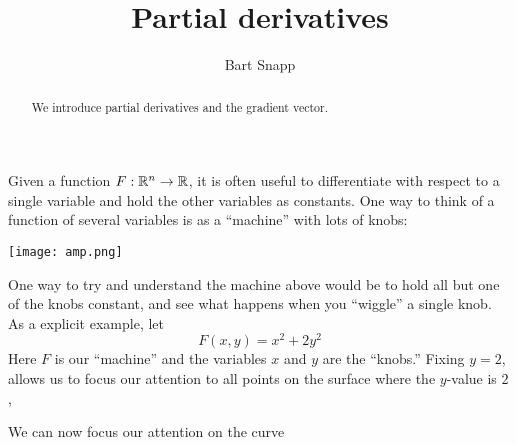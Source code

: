 \documentclass{ximera}
\author{Bart Snapp}
\title[Dig-In:]{Partial derivatives}
\begin{document}
\begin{abstract}
  We introduce partial derivatives and the gradient vector.
\end{abstract}
\maketitle

Given a function $F:\mathbb R^n \to \mathbb R$, it is often useful to differentiate
with respect to a single variable and hold the other variables as
constants. One way to think of a function of several variables is as a
``machine'' with lots of knobs:
\begin{image}
  \texttt{[image: amp.png]}
\end{image}
One way to try and understand the machine above would be to hold all
but one of the knobs constant, and see what happens when you
``wiggle'' a single knob.  As a explicit example, let
\[
F(x,y) = x^2+2y^2
\]
Here $F$ is our ``machine'' and the variables $x$ and $y$ are the ``knobs.''
Fixing $y=2$, allows us to focus our attention to all points on the
surface where the $y$-value is $2$,
\begin{image}
\end{image}
We can now focus our attention on the curve 
\end{document}
